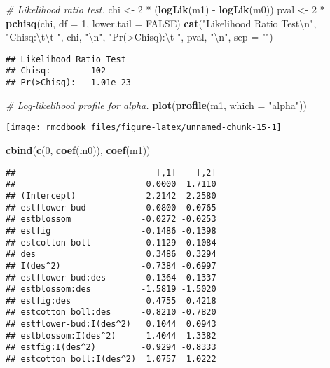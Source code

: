 \documentclass[9pt,a5paper,]{book}
\newenvironment{Shaded}{}{}
\newcommand{\KeywordTok}[1]{\textbf{{#1}}}
\newcommand{\DataTypeTok}[1]{\underline{{#1}}}
\newcommand{\DecValTok}[1]{{#1}}
\newcommand{\CharTok}[1]{{#1}}
\newcommand{\StringTok}[1]{{#1}}
\newcommand{\CommentTok}[1]{\textit{{#1}}}
\newcommand{\OtherTok}[1]{{#1}}
\newcommand{\NormalTok}[1]{{#1}}
\renewenvironment{Shaded}{\color{inputcolor}}{}
\renewcommand{\DataTypeTok}[1]{{#1}}
\theoremstyle{definition}
\theoremstyle{definition}
\theoremstyle{remark}
\begin{document}
\begin{Shaded}
\begin{Highlighting}[]
\CommentTok{# Likelihood ratio test.}
\NormalTok{chi <-}\StringTok{ }\DecValTok{2} \NormalTok{*}\StringTok{ }\NormalTok{(}\KeywordTok{logLik}\NormalTok{(m1) -}\StringTok{ }\KeywordTok{logLik}\NormalTok{(m0))}
\NormalTok{pval <-}\StringTok{ }\DecValTok{2} \NormalTok{*}\StringTok{ }\KeywordTok{pchisq}\NormalTok{(chi, }\DataTypeTok{df =} \DecValTok{1}\NormalTok{, }\DataTypeTok{lower.tail =} \OtherTok{FALSE}\NormalTok{)}
\KeywordTok{cat}\NormalTok{(}\StringTok{"Likelihood Ratio Test}\CharTok{\textbackslash{}n}\StringTok{"}\NormalTok{,}
    \StringTok{"Chisq:}\CharTok{\textbackslash{}t\textbackslash{}t}\StringTok{ "}\NormalTok{, chi, }\StringTok{"}\CharTok{\textbackslash{}n}\StringTok{"}\NormalTok{,}
    \StringTok{"Pr(>Chisq):}\CharTok{\textbackslash{}t}\StringTok{ "}\NormalTok{, pval, }\StringTok{"}\CharTok{\textbackslash{}n}\StringTok{"}\NormalTok{,}
    \DataTypeTok{sep =} \StringTok{""}\NormalTok{)}
\end{Highlighting}
\end{Shaded}

\begin{verbatim}
## Likelihood Ratio Test
## Chisq:        102
## Pr(>Chisq):   1.01e-23
\end{verbatim}

\begin{Shaded}
\begin{Highlighting}[]
\CommentTok{# Log-likelihood profile for alpha.}
\KeywordTok{plot}\NormalTok{(}\KeywordTok{profile}\NormalTok{(m1, }\DataTypeTok{which =} \StringTok{"alpha"}\NormalTok{))}
\end{Highlighting}
\end{Shaded}

\begin{center}\texttt{[image: rmcdbook\_files/figure-latex/unnamed-chunk-15-1]} \end{center}

\begin{Shaded}
\begin{Highlighting}[]
\KeywordTok{cbind}\NormalTok{(}\KeywordTok{c}\NormalTok{(}\DecValTok{0}\NormalTok{, }\KeywordTok{coef}\NormalTok{(m0)), }\KeywordTok{coef}\NormalTok{(m1))}
\end{Highlighting}
\end{Shaded}

\begin{verbatim}
##                            [,1]    [,2]
##                          0.0000  1.7110
## (Intercept)              2.2142  2.2580
## estflower-bud           -0.0800 -0.0765
## estblossom              -0.0272 -0.0253
## estfig                  -0.1486 -0.1398
## estcotton boll           0.1129  0.1084
## des                      0.3486  0.3294
## I(des^2)                -0.7384 -0.6997
## estflower-bud:des        0.1364  0.1337
## estblossom:des          -1.5819 -1.5020
## estfig:des               0.4755  0.4218
## estcotton boll:des      -0.8210 -0.7820
## estflower-bud:I(des^2)   0.1044  0.0943
## estblossom:I(des^2)      1.4044  1.3382
## estfig:I(des^2)         -0.9294 -0.8333
## estcotton boll:I(des^2)  1.0757  1.0222
\end{verbatim}
\end{document}
